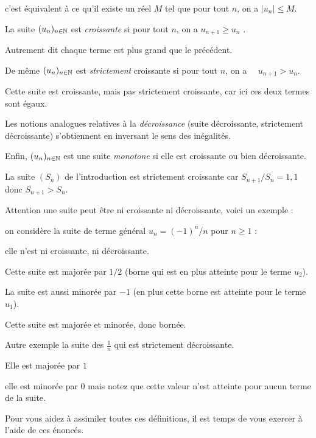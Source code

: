 c'est équivalent à ce qu'il existe un réel $M$ 
tel que pour tout $n$, on a $|u_n| \leq M$.


\diapo

La suite $(u_n)_{n\in \mathbb{N}}$ est \emph{croissante} si pour tout  $n$, on a $u_{n+1} \ge u_n $ .

\change

Autrement dit chaque terme est plus grand que le précédent.

\change

De même $(u_n)_{n\in \mathbb{N}}$ est \emph{strictement} croissante si pour tout $n$, on a $\quad u_{n+1} > u_n$.

Cette suite est croissante, mais pas strictement croissante, car ici ces deux termes sont égaux.

\change

Les notions analogues relatives à la \emph{décroissance} (suite décroissante, strictement décroissante) s'obtiennent en inversant le sens des inégalités.

\change

Enfin, $(u_n)_{n\in \mathbb{N}}$ est une suite \emph{monotone} si elle est croissante ou bien décroissante.



\diapo

La suite $(S_n)$ de l'introduction est strictement croissante car 
$S_{n+1}/S_n=1,1$ donc $S_{n+1} > S_n$.

\change


Attention une suite peut être ni croissante ni décroissante, voici un exemple : 

on considère la suite de terme général $u_n=(-1)^n/n$ pour $n\geq 1$ :

elle n'est ni croissante, ni décroissante.

\change 

Cette suite est majorée par $1/2$ (borne qui est en plus atteinte 
pour le terme $u_2$).

\change

La suite est aussi minorée par $-1$ (en plus cette borne est atteinte pour le terme $u_1$).

Cette suite est majorée et minorée, donc bornée.

\change

Autre exemple la suite des $\frac1n$ qui est strictement décroissante. 

\change

Elle est majorée par $1$ 

\change


elle est minorée par $0$ mais notez que cette valeur n'est atteinte pour aucun terme de la suite.

\diapo

Pour vous aidez à assimiler toutes ces définitions, il est temps de 
vous exercer à l'aide de ces énoncés.




